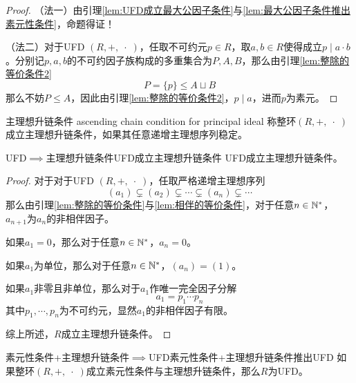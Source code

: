\begin{proof}
	（法一）由引理\ref{lem:UFD成立最大公因子条件}与\ref{lem:最大公因子条件推出素元性条件}，命题得证！
	
	（法二）对于UFD $(R,+,\;\cdot\;)$，任取不可约元$p\in R$，取$a,b\in R$使得成立$p\mid a\cdot b$。分别记$p,a,b$的不可约因子族构成的多重集合为$P,A,B$，那么由引理\ref{lem:整除的等价条件2}
	$$
	P=\{p\}\le A\sqcup B
	$$
	那么不妨$P\le A$，因此由引理\ref{lem:整除的等价条件2}，$p\mid a$，进而$p$为素元。
\end{proof}

\begin{definition}{主理想升链条件 ascending chain condition for principal ideal}
	称整环$(R,+,\;\cdot\;)$成立主理想升链条件，如果其任意递增主理想序列稳定。
\end{definition}

\begin{lemma}{UFD$\implies$主理想升链条件}{UFD成立主理想升链条件}
	UFD成立主理想升链条件。
\end{lemma}

\begin{proof}
	对于对于UFD $(R,+,\;\cdot\;)$，任取严格递增主理想序列
	$$
	(a_1)\subsetneq (a_2)\subsetneq \cdots \subsetneq (a_n)\subsetneq \cdots 
	$$
	那么由引理\ref{lem:整除的等价条件}与\ref{lem:相伴的等价条件}，对于任意$n\in\mathbb{N}^*$，$a_{n+1}$为$a_n$的非相伴因子。
	
	如果$a_1=0$，那么对于任意$n\in\mathbb{N}^*$，$a_n=0$。
	
	如果$a_1$为单位，那么对于任意$n\in\mathbb{N}^*$，$(a_n)=(1)$。
	
	如果$a_1$非零且非单位，那么对于$a_1$作唯一完全因子分解
	$$
	a_1=p_1\cdots p_n
	$$
	其中$p_1,\cdots,p_n$为不可约元，显然$a_1$的非相伴因子有限。
	
	综上所述，$R$成立主理想升链条件。
\end{proof}

\begin{lemma}{素元性条件+主理想升链条件$\implies$UFD}{素元性条件+主理想升链条件推出UFD}
	如果整环$(R,+,\;\cdot\;)$成立素元性条件与主理想升链条件，那么$R$为UFD。
\end{lemma}

